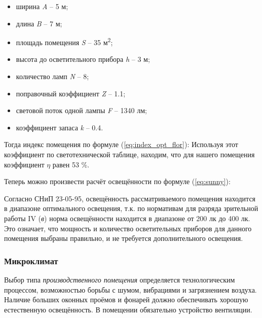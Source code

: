 \begin{itemize}
\item ширина \foreignlanguage{english}{\textit{A}} – \foreignlanguage{english}{5} м;
\item длина \foreignlanguage{english}{\textit{B}}\foreignlanguage{english}{ }– 7 м;
\item площадь помещения \foreignlanguage{english}{\textit{S}}\foreignlanguage{english}{ }– 35 м\textsuperscript{2};
\item высота до осветительного прибора \foreignlanguage{english}{\textit{h}} – 3 м;
\item количество ламп \foreignlanguage{english}{\textit{N}} – 8;
\item поправочный коэффициент \foreignlanguage{english}{\textit{Z}} – 1.1;
\item световой поток одной лампы \foreignlanguage{english}{\textit{F}} – 1340 лм;
\item коэффициент запаса \foreignlanguage{english}{\textit{k}} – 0.4.
\end{itemize}
Тогда индекс помещения по формуле (\ref{eq:index_opt_flor}):
Используя этот коэффициент по светотехнической таблице, находим, что для нашего помещения коэффициент \textit{$\eta $ }равен 53 \%.

Теперь можно произвести расчёт освещённости по формуле (\ref{eq:sunny}):

$$
$$
Согласно СНиП 23-05-95, освещённость рассматриваемого помещения находится в диапазоне оптимального освещения, т.к. по нормативам для разряда зрительной работы \foreignlanguage{english}{IV} (\textit{в}) норма освещённости находится в диапазоне от 200 лк до 400 лк. Это означает, что мощность и количество осветительных приборов для данного помещения выбраны правильно, и не требуется дополнительного освещения.
\subsubsection{Микроклимат}

Выбор типа \textit{производственного помещения} определяется технологическим процессом, возможностью борьбы с шумом, вибрациями и загрязнением воздуха. Наличие больших оконных проёмов и фонарей должно обеспечивать хорошую естественную освещённость. В помещении обязательно устройство вентиляции.

